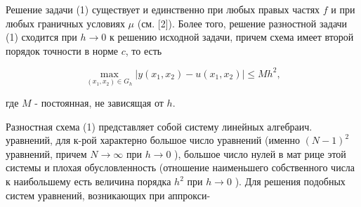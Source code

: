 \documentclass[10pt]{article}
\begin{document}
Решение задачи (1) существует и единственно при любых правых частях $f$ и при любых граничных условиях $\mu$ (см. [2]). Более того, решение разностной задачи (1) сходится при $h \rightarrow 0$ к решению исходной задачи, причем схема имеет второй порядок точности в норме $c$, то есть



\[

\max _{\left(x_{1}, x_{2}\right) \in G_{h}}\left|y\left(x_{1}, x_{2}\right)-u\left(x_{1}, x_{2}\right)\right| \leqslant M h^{2},

\]



где $M$ - постоянная, не зависящая от $h$.



Разностная схема (1) представляет собой систему линейных алгебраич. уравнений, для к-рой характерно большое число уравнений (именно $(N-1)^{2}$ уравнений, причем $N \rightarrow \infty$ при $h \rightarrow 0$ ), большое число нулей в мат рице этой системы и плохая обусловленность (отношение наименьшего собственного числа к наибольшему есть величина порядка $h^{2}$ при $h \rightarrow 0$ ). Для решения подобных систем уравнений, возникающих при аппрокси-
\end{document}
